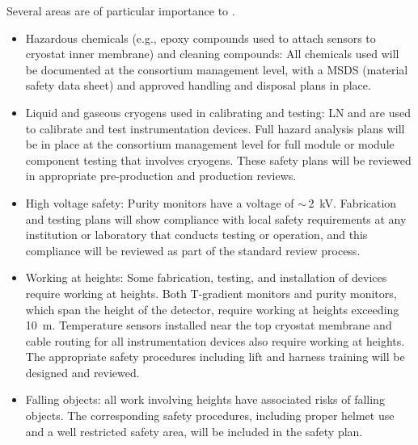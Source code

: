 Several areas are of particular importance to .
\begin{itemize}
\item Hazardous chemicals (e.g., epoxy compounds used to attach sensors to cryostat inner membrane) and cleaning compounds:
  All chemicals used will be documented at the consortium management level, with a MSDS (material safety data sheet) and approved handling and disposal plans in place.

\item Liquid and gaseous cryogens used in calibrating and testing: LN and \lar %
are used to calibrate and test instrumentation devices.
  Full hazard analysis plans will be in place at the consortium management level for full module or
  module component testing that involves %
  cryogens. These safety plans will be reviewed in appropriate pre-production and production reviews.

\item High voltage safety:  Purity monitors %
have a voltage of $\sim\,$\SI{2}{kV}. Fabrication and testing plans will show compliance with local
   safety requirements at %
  any institution or laboratory that conducts testing or operation, and this compliance will be reviewed as part of the standard review process.


\item Working at heights: Some fabrication, testing, and installation of  devices require working at heights.
  Both T-gradient monitors and purity monitors, which span the height of the detector, require working at heights exceeding \SI{10}{m}.
  Temperature sensors installed near the top cryostat membrane and cable routing for all instrumentation devices
  also require working at heights. %
  The appropriate safety procedures including lift and harness training will be designed and reviewed. 
  
\item Falling objects: all work involving heights have associated risks of falling objects. The corresponding safety procedures, including proper helmet use 
and a well restricted safety area, will be included in the safety plan. 
\end{itemize}
